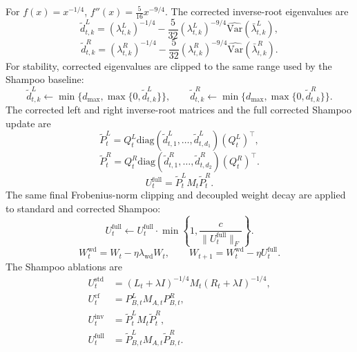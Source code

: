 \documentclass{article}
\newcommand{\Var}{\mathrm{Var}}
\begin{document}
For $f(x)=x^{-1/4}$, $f''(x)=\frac{5}{16}x^{-9/4}$. The corrected inverse-root eigenvalues are
\begin{equation}
    \widetilde d^L_{t,k}
    =
    (\lambda^L_{t,k})^{-1/4}
    -
    \frac{5}{32}(\lambda^L_{t,k})^{-9/4}\widehat{\Var}(\bar\lambda^L_{t,k}),
\end{equation}
\begin{equation}
    \widetilde d^R_{t,k}
    =
    (\lambda^R_{t,k})^{-1/4}
    -
    \frac{5}{32}(\lambda^R_{t,k})^{-9/4}\widehat{\Var}(\bar\lambda^R_{t,k}).
\end{equation}
For stability, corrected eigenvalues are clipped to the same range used by the Shampoo baseline:
\begin{equation}
    \widetilde d^L_{t,k}\leftarrow \min\{d_{\max},\max\{0,\widetilde d^L_{t,k}\}\},
    \qquad
    \widetilde d^R_{t,k}\leftarrow \min\{d_{\max},\max\{0,\widetilde d^R_{t,k}\}\}.
\end{equation}
The corrected left and right inverse-root matrices and the full corrected Shampoo update are
\begin{equation}
    \widetilde P_t^L
    =
    Q_t^L\mathrm{diag}(\widetilde d^L_{t,1},\ldots,\widetilde d^L_{t,d_1})(Q_t^L)^\top,
\end{equation}
\begin{equation}
    \widetilde P_t^R
    =
    Q_t^R\mathrm{diag}(\widetilde d^R_{t,1},\ldots,\widetilde d^R_{t,d_2})(Q_t^R)^\top.
\end{equation}
\begin{equation}
    U_t^{\mathrm{full}}
    =
    \widetilde P_t^L M_t \widetilde P_t^R.
\end{equation}
The same final Frobenius-norm clipping and decoupled weight decay are applied to standard and corrected Shampoo:
\begin{equation}
    U_t^{\mathrm{full}}
    \leftarrow
    U_t^{\mathrm{full}}\cdot \min\left\{1,\frac{c}{\|U_t^{\mathrm{full}}\|_F}\right\}.
\end{equation}
\begin{equation}
    W_t^{\mathrm{wd}}=W_t-\eta\lambda_{\mathrm{wd}}W_t,
    \qquad
    W_{t+1}=W_t^{\mathrm{wd}}-\eta U_t^{\mathrm{full}}.
\end{equation}
The Shampoo ablations are
\begin{align}
    U_t^{\mathrm{std}}
    &=
    (L_t+\lambda I)^{-1/4}M_t(R_t+\lambda I)^{-1/4}, \\
    U_t^{\mathrm{cf}}
    &=
    P_{B,t}^L M_{A,t}P_{B,t}^R, \\
    U_t^{\mathrm{inv}}
    &=
    \widetilde P_t^L M_t\widetilde P_t^R, \\
    U_t^{\mathrm{full}}
    &=
    \widetilde P_{B,t}^L M_{A,t}\widetilde P_{B,t}^R.
\end{align}
\end{document}
